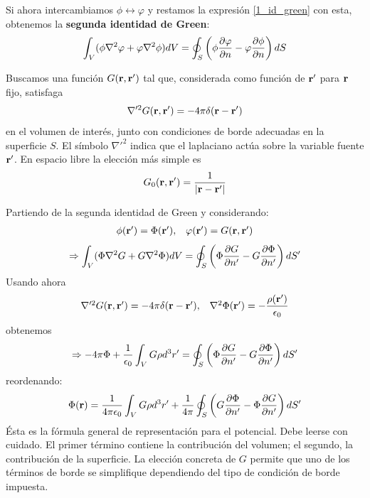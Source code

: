 \documentclass[]{article}
\numberwithin{equation}{section}
\begin{document}
Si ahora intercambiamos \(\phi\leftrightarrow\varphi\) y restamos la expresión \ref{1_id_green} con esta, obtenemos la  \textbf{segunda identidad de Green}:
\begin{equation}
	\int_{V}(\phi\nabla^2\varphi + \varphi\nabla^2\phi)dV = \oint_{S}\left(\phi\frac{\partial\varphi}{\partial n} - \varphi\frac{\partial\phi}{\partial n}\right)dS
	\label{2_id_green}
\end{equation}

Buscamos una función \(G(\mathbf{r}, \mathbf{r}')\) tal que, considerada como función de \(\mathbf{r}'\) para \(\mathbf{r}\) fijo, satisfaga
\begin{equation}
	\nabla'^2 G(\mathbf{r}, \mathbf{r}') = -4\pi\delta(\mathbf{r} - \mathbf{r}')\label{lap_G}
\end{equation}
en el volumen de interés, junto con condiciones de borde adecuadas en la superficie \(S\). El símbolo \(\nabla'^2\) indica que el laplaciano actúa sobre la variable fuente \(\mathbf{r}'\). En espacio libre la elección más simple es
\begin{equation}
	G_0(\mathbf{r},\mathbf{r}') = \frac{1}{|\mathbf{r} - \mathbf{r}'|}
\end{equation}

Partiendo de la segunda identidad de Green y considerando:
\begin{equation*}
	\begin{matrix}
		\phi(\mathbf{r}') = \Phi(\mathbf{r}'),& \varphi(\mathbf{r}') = G(\mathbf{r},\mathbf{r}')
	\end{matrix}
\end{equation*}
\begin{equation*}
	\Rightarrow \int_{V}(\Phi\nabla^2 G + G\nabla^2\Phi)dV = \oint_{S}\left(\Phi\frac{\partial G}{\partial n'} -  G\frac{\partial\Phi}{\partial n'}\right)dS'
\end{equation*}
Usando ahora
\begin{equation*}
	\begin{matrix}
		\nabla'^2 G(\mathbf{r}, \mathbf{r}') = -4\pi\delta(\mathbf{r} - \mathbf{r}'),& \nabla^2\Phi(\mathbf{r}') = - \dfrac{\rho(\mathbf{r}')}{\epsilon_{0}}
	\end{matrix}
\end{equation*}
obtenemos
\begin{equation*}
	\Rightarrow -4\pi\Phi + \frac{1}{\epsilon_{0}}\int_{V}G\rho d^3r' = \oint_{S}\left(\Phi\frac{\partial G}{\partial n'} -  G\frac{\partial\Phi}{\partial n'}\right)dS'
\end{equation*}
reordenando:
\begin{equation}
	\Phi(\mathbf{r}) = \frac{1}{4\pi\epsilon_{0}}\int_{V}G\rho d^3r' + \frac{1}{4\pi}\oint_{S}\left( G\frac{\partial\Phi}{\partial n'} - \Phi\frac{\partial G}{\partial n'} \right)dS'
	\label{poisson_sol_green}
\end{equation}
Ésta es la fórmula general de representación para el potencial. Debe leerse con cuidado. El primer término contiene la contribución del volumen; el segundo, la contribución de la superficie. La elección concreta de \(G\) permite que uno de los términos de borde se simplifique dependiendo del tipo de condición de borde impuesta.
\end{document}
